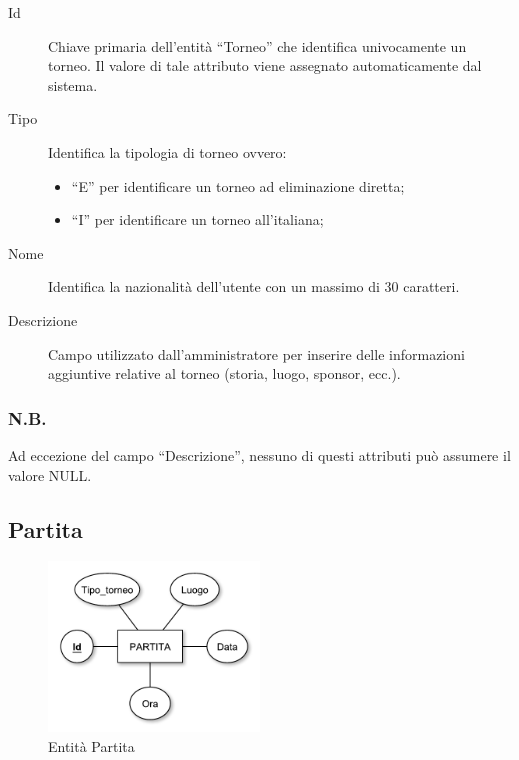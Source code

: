 		\begin{description}
			
			\item[Id]
			Chiave primaria dell'entità ``Torneo'' che identifica univocamente un torneo. Il valore di tale attributo viene assegnato automaticamente dal sistema.
			
			\item[Tipo]
			Identifica la tipologia di torneo ovvero:
			\begin{itemize}
				\item
				``E'' per identificare un torneo ad eliminazione diretta;
				\item
				``I'' per identificare un torneo all'italiana;
			\end{itemize}
			
			\item[Nome]
			Identifica la nazionalità dell'utente con un massimo di 30 caratteri.
			
			\item[Descrizione]
			Campo utilizzato dall'amministratore per inserire delle informazioni aggiuntive relative al torneo (storia, luogo, sponsor, ecc.).
			
		\end{description}
		
		\subsubsection*{N.B.}
		Ad eccezione del campo ``Descrizione'', nessuno di questi attributi può assumere il valore NULL.
	
	\subsection{Partita}
		
		\begin{figure}[h]
			\centering
			\includegraphics[width=0.5\textwidth]
			{immagini/07-partita}
			
			\caption{Entità Partita}
		\end{figure}
		
